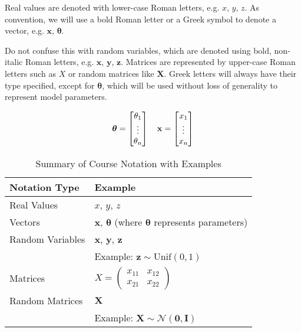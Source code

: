 Real values are denoted with lower-case Roman letters, e.g. $x$, $y$, $z$. As convention, we will use a bold Roman letter or a Greek symbol to denote a vector, e.g. $\bm{x}$, $\boldsymbol{\theta}$.

Do not confuse this with random variables, which are denoted using bold, non-italic Roman letters, e.g. $\mathbf{x}$, $\mathbf{y}$, $\mathbf{z}$. Matrices are represented by upper-case Roman letters such as $X$ or random matrices like $\mathbf{X}$. Greek letters will always have their type specified, except for $\boldsymbol{\theta}$, which will be used without loss of generality to represent model parameters.




\[
    \boldsymbol{\theta} = \begin{bmatrix}
        \theta_1 \\ \vdots \\ \theta_n
    \end{bmatrix}
    \quad
    \mathbf{x} = \begin{bmatrix}
        x_1 \\ \vdots \\ x_n
    \end{bmatrix}
\]


\begin{table}[h!]
    \centering
    \begin{tabularx}{\textwidth}{@{}X X@{}}
        \toprule
        \textbf{Notation Type} & \textbf{Example}                                                                        \\ \midrule
        Real Values            & $x$, $y$, $z$                                                                           \\
        Vectors                & $\bm{x}$, $\boldsymbol{\theta}$ (where $\boldsymbol{\theta}$ represents parameters) \\
        Random Variables       & $\mathbf{x}$, $\mathbf{y}$, $\mathbf{z}$                                                \\
                               & Example: $\mathbf{z} \sim \text{Unif}(0, 1)$                                            \\
        Matrices               & $X = \begin{pmatrix} x_{11} & x_{12} \\ x_{21} & x_{22} \end{pmatrix}$                  \\
        Random Matrices        & $\mathbf{X}$                                                                            \\
                               & Example: $\mathbf{X} \sim \mathcal{N}(\mathbf{0}, \mathbf{I})$                          \\ \bottomrule
    \end{tabularx}
    \caption{Summary of Course Notation with Examples}
\end{table}






